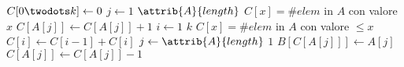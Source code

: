 \begin{codebox}
\li $C[0\twodots k] \leftarrow 0$
\li \For $j \gets 1$ \To $\attrib{A}{length}$
\zi     \Then
        \Comment $C[x] = \# elem$ in $A$ con valore $x$
\li         $C[A[j]] \gets C[A[j]] + 1$ 
        \End
\li \For $i \gets 1$ \To $k$
\zi     \Then
        \Comment $C[x] = \# elem$ in $A$ con valore $\leq x$
\li            $C[i] \gets C[i-1] + C[i]$ 
        \End
\li \For $j \gets \attrib{A}{length}$  \To $1$
\li     \Then
            $B[C[A[j]]] \gets A[j]$
\li         $C[A[j]] \gets C[A[j]] - 1$
        \End
\end{codebox}